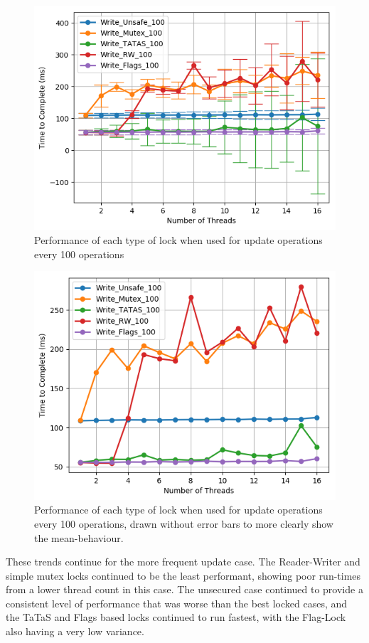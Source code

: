 \documentclass[11pt]{article}
\begin{document}
\begin{figure}
\centering
\includegraphics[scale=0.65]{step7_3.png}
\caption{Performance of each type of lock when used for update operations every 100 operations}
\label{fig:step7_3}
\end{figure}

\begin{figure}
\centering
\includegraphics[scale=0.65]{step7_4.png}
\caption{Performance of each type of lock when used for update operations every 100 operations, drawn without error bars to more clearly show the mean-behaviour.}
\label{fig:step7_4}
\end{figure}

These trends continue for the more frequent update case. The Reader-Writer and simple mutex locks continued to be the least performant, showing poor run-times from a lower thread count in this case. The unsecured case continued to provide a consistent level of performance that was worse than the best locked cases, and the TaTaS and Flags based locks continued to run fastest, with the Flag-Lock also having a very low variance.
\end{document}
